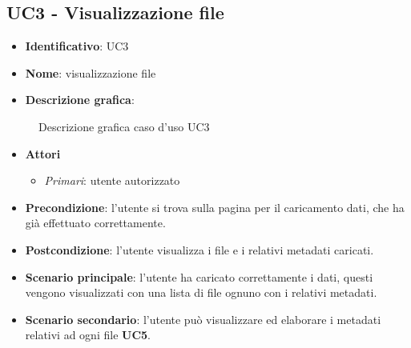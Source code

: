 
\subsection{UC3 - Visualizzazione file}
\begin{itemize}
  \item \textbf{Identificativo}: UC3
  \item \textbf{Nome}: visualizzazione file
  \item \textbf{Descrizione grafica}:
\end{itemize}

\begin{figure}[h]
  \centering
  \caption{Descrizione grafica caso d'uso UC3}
\end{figure}

\begin{itemize}
  \item \textbf{Attori}
        \begin{itemize}
          \item \textit{Primari}: utente autorizzato
        \end{itemize}
  \item \textbf{Precondizione}: l'utente si trova sulla pagina per il caricamento dati, che ha già effettuato correttamente.
  \item \textbf{Postcondizione}: l'utente visualizza i file e i relativi metadati caricati.
  \item \textbf{Scenario principale}: l'utente ha caricato correttamente i dati, questi vengono visualizzati con una lista di file ognuno con i relativi metadati.
  \item \textbf{Scenario secondario}: l'utente può visualizzare ed elaborare i metadati relativi ad ogni file \textbf{UC5}.
\end{itemize}


